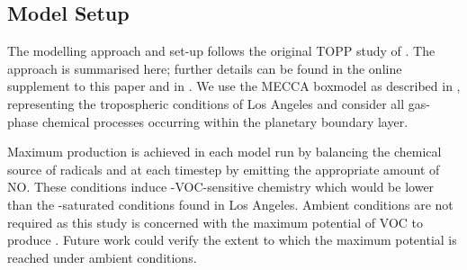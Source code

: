 \subsection{Model Setup} \label{ss:model_setup}
%
The modelling approach and set-up follows the original TOPP study of \citet{Butler:2011}.
The approach is summarised here; further details can be found in the online supplement to this paper and in \citet{Butler:2011}. 
We use the MECCA boxmodel \citep{Sander:2005} as described in \citet{Butler:2011}, representing the tropospheric conditions of Los Angeles and consider all gas-phase chemical processes occurring within the planetary boundary layer.

Maximum  production is achieved in each model run by balancing the chemical source of radicals and  at each timestep by emitting the appropriate amount of NO.
These  conditions induce -VOC-sensitive chemistry which would be lower than the -saturated conditions found in Los Angeles.
Ambient  conditions are not required as this study is concerned with the maximum potential of VOC to produce .
Future work could verify the extent to which the maximum potential is reached under ambient  conditions.

